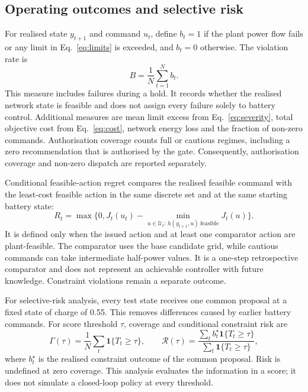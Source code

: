 \documentclass[11pt,a4paper]{article}
\newcommand{\ind}{\mathbf{1}}
\begin{document}
\subsection{Operating outcomes and selective risk}
For realised state $y_{t+1}$ and command $u_t$, define $b_t=1$ if the plant power flow fails or any limit in Eq.~\eqref{eq:limits} is exceeded, and $b_t=0$ otherwise. The violation rate is
\begin{equation}
B=\frac{1}{N}\sum_{t=1}^{N}b_t.\label{eq:violations}
\end{equation}
This measure includes failures during a hold. It records whether the realised network state is feasible and does not assign every failure solely to battery control. Additional measures are mean limit excess from Eq.~\eqref{eq:severity}, total objective cost from Eq.~\eqref{eq:cost}, network energy loss and the fraction of non-zero commands. Authorisation coverage counts full or cautious regimes, including a zero recommendation that is authorised by the gate. Consequently, authorisation coverage and non-zero dispatch are reported separately.

Conditional feasible-action regret compares the realised feasible command with the least-cost feasible action in the same discrete set and at the same starting battery state:
\begin{equation}
R_t=\max\{0,J_t(u_t)-\min_{u\in\mathcal U_t:\,h(y_{t+1},u)\ \mathrm{feasible}}J_t(u)\}.\label{eq:regret}
\end{equation}
It is defined only when the issued action and at least one comparator action are plant-feasible. The comparator uses the base candidate grid, while cautious commands can take intermediate half-power values. It is a one-step retrospective comparator and does not represent an achievable controller with future knowledge. Constraint violations remain a separate outcome.

For selective-risk analysis, every test state receives one common proposal at a fixed state of charge of 0.55. This removes differences caused by earlier battery commands. For score threshold $\tau$, coverage and conditional constraint risk are
\begin{equation}
\Gamma(\tau)=\frac{1}{N}\sum_t\ind\{T_t\geq\tau\},\qquad
\mathcal R(\tau)=\frac{\sum_t b_t^{\star}\ind\{T_t\geq\tau\}}
{\sum_t\ind\{T_t\geq\tau\}},\label{eq:riskcoverage}
\end{equation}
where $b_t^{\star}$ is the realised constraint outcome of the common proposal. Risk is undefined at zero coverage. This analysis evaluates the information in a score; it does not simulate a closed-loop policy at every threshold.
\end{document}

